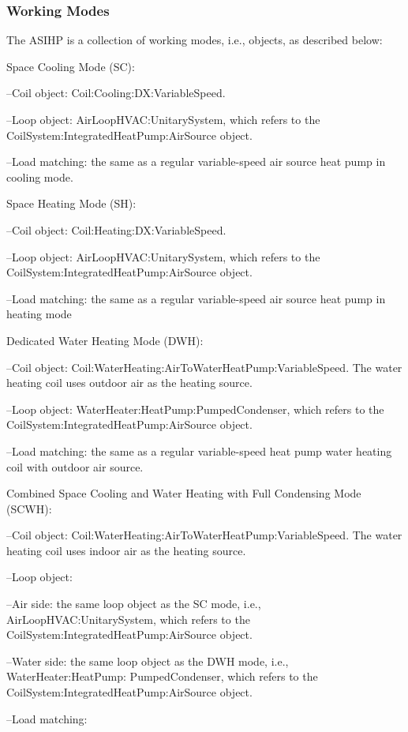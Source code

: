 \subsubsection{Working Modes}\label{Working-Modes-ASIHP}

The ASIHP is a collection of working modes, i.e., objects, as described below:

Space Cooling Mode (SC):

--Coil object: Coil:Cooling:DX:VariableSpeed.

--Loop object: AirLoopHVAC:UnitarySystem,  which refers to the CoilSystem:IntegratedHeatPump:AirSource object.

--Load matching: the same as a regular variable-speed air source heat pump in cooling mode.

Space Heating Mode (SH):

--Coil object: Coil:Heating:DX:VariableSpeed.

--Loop object: AirLoopHVAC:UnitarySystem, which refers to the CoilSystem:IntegratedHeatPump:AirSource object.

--Load matching: the same as a regular variable-speed air source heat pump in heating mode

Dedicated Water Heating Mode (DWH):

--Coil object: Coil:WaterHeating:AirToWaterHeatPump:VariableSpeed. The water heating coil uses outdoor air as the heating source.

--Loop object: WaterHeater:HeatPump:PumpedCondenser, which refers to the CoilSystem:IntegratedHeatPump:AirSource object.

--Load matching: the same as a regular variable-speed heat pump water heating coil with outdoor air source.

Combined Space Cooling and Water Heating with Full Condensing Mode (SCWH):

--Coil object: Coil:WaterHeating:AirToWaterHeatPump:VariableSpeed. The water heating coil uses indoor air as the heating source.

--Loop object:

--Air side: the same loop object as the SC mode, i.e., AirLoopHVAC:UnitarySystem, which refers to the CoilSystem:IntegratedHeatPump:AirSource object.

--Water side: the same loop object as the DWH mode, i.e., WaterHeater:HeatPump: PumpedCondenser, which refers to the CoilSystem:IntegratedHeatPump:AirSource object.

--Load matching:

